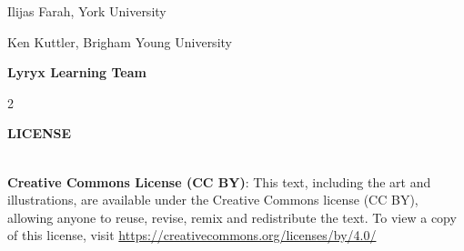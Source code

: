{\small

\begin{center}
Ilijas Farah, York University
\smallskip

Ken Kuttler, Brigham Young University
\smallskip

\bigskip
\textbf{Lyryx Learning Team}
\vspace{-1em}

\begin{multicols}{2}
\end{multicols}
\end{center}

}

\vfill

\begin{center}
\fontsize{14pt}{16pt}\selectfont\textcolor{titletextcolour}{\textbf{LICENSE}}
\end{center}
%
\begin{center}
%
\noindent {} \\
%
\noindent \textbf{Creative Commons License (CC BY)}: This text, including the art and illustrations, are available under the Creative Commons license (CC BY), allowing anyone to reuse, revise, remix and redistribute the text.   
%
\noindent To view a copy of this license, visit \href{https://creativecommons.org/licenses/by/4.0/}{https://creativecommons.org/licenses/by/4.0/}
\end{center}
%
\setlength{\parskip}{\baselineskip}
